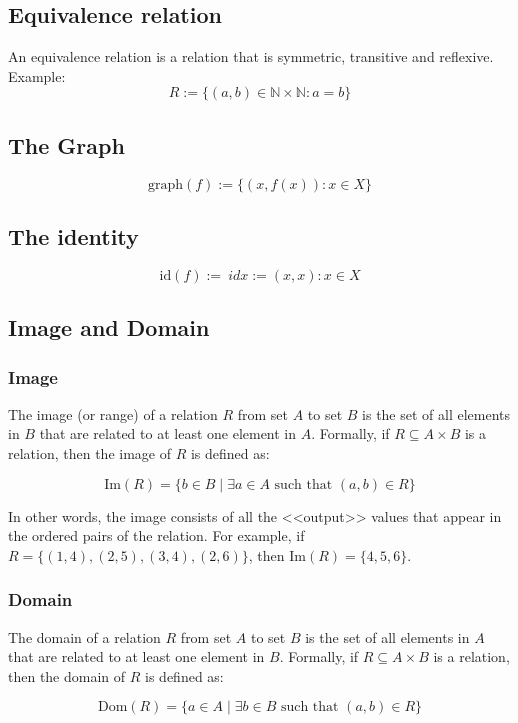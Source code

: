 \subsection{Equivalence relation}
An equivalence relation is a relation that is symmetric, transitive and reflexive.
\\
Example:
\[
	R:= \{ (a,b) \in \mathbb{N} \times \mathbb{N}: a = b\}
\]

\subsection{The Graph}

\[
	\text{graph}(f):= \{(x, f(x)): x \in X\}
\]

\subsection{The identity}

\[
	\text{id}(f):= \ idx:={(x, x): x \in X}
\]

\subsection{Image and Domain}

\subsubsection{Image}
The image (or range) of a relation $R$ from set $A$ to set $B$ is the set of all elements in $B$ that are related to at least one element in $A$. Formally, if $R \subseteq A \times B$ is a relation, then the image of $R$ is defined as:

\[\text{Im}(R) = \{b \in B \mid \exists a \in A \text{ such that } (a,b) \in R\}\]

In other words, the image consists of all the <<output>> values that appear in the ordered pairs of the relation. For example, if $R = \{(1,4), (2,5), (3,4), (2,6)\}$, then $\text{Im}(R) = \{4, 5, 6\}$.

\subsubsection{Domain}
The domain of a relation $R$ from set $A$ to set $B$ is the set of all elements in $A$ that are related to at least one element in $B$. Formally, if $R \subseteq A \times B$ is a relation, then the domain of $R$ is defined as:

\[\text{Dom}(R) = \{a \in A \mid \exists b \in B \text{ such that } (a,b) \in R\}\]


